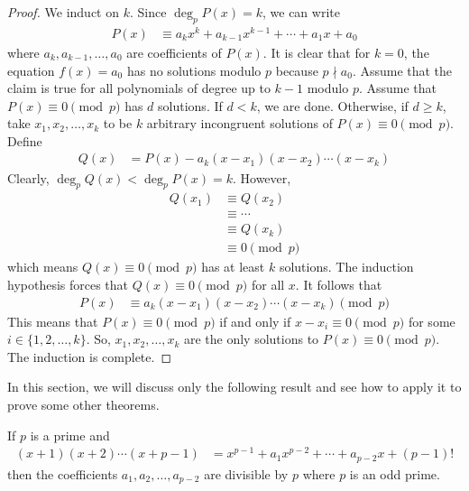 \documentclass[12pt]{subfile}
\begin{document}
		\begin{proof}
			We induct on $k$. Since $\deg_p P(x) = k$, we can write
				\begin{align*}
					P(x)
						& \equiv a_kx^k + a_{k-1}x^{k-1} + \cdots + a_1 x +a_0
				\end{align*}
			where $a_k, a_{k-1}, \ldots, a_0$ are coefficients of $P(x)$. It is clear that for $k=0$, the equation $f(x)=a_0$ has no solutions modulo $p$ because $p \nmid a_0$. Assume that the claim is true for all polynomials of degree up to $k-1$ modulo $p$. Assume that $P(x) \equiv 0 \pmod p$ has $d$ solutions. If $d < k$, we are done. Otherwise, if $d\geq k$, take $x_1, x_2, \ldots, x_k$ to be $k$ arbitrary incongruent solutions of $P(x) \equiv 0 \pmod p$. Define
				\begin{align*}
					Q(x)
						& = P(x) - a_k(x-x_1)(x-x_2)\cdots (x-x_k)
				\end{align*}
			Clearly, $\deg_p Q(x) < \deg_p P(x)=k$. However,
				\begin{align*}
					Q(x_1)
						& \equiv Q(x_2)\\
						& \equiv \cdots \\
						& \equiv Q(x_k)\\
						& \equiv 0 \pmod p
				\end{align*}
			which means $Q(x) \equiv 0 \pmod p$ has at least $k$ solutions. The induction hypothesis forces that $Q(x) \equiv 0 \pmod p$ for all $x$. It follows that
				\begin{align*}
					P(x)
						& \equiv a_k(x-x_1)(x-x_2)\cdots (x-x_k) \pmod p
				\end{align*}
			This means that $P(x) \equiv 0 \pmod p$ if and only if $x-x_i \equiv 0 \pmod p$ for some $i \in \{1,2,\ldots, k\}$. So, $x_1, x_2, \ldots, x_k$ are the only solutions to $P(x) \equiv 0 \pmod p$. The induction is complete.
		\end{proof}


	In this section, we will discuss only the following result and see how to apply it to prove some other theorems.
		\begin{theorem}[Lagrange]
			If $p$ is a prime and\label{thm:lag2}
				\begin{align}\label{eq:lagrangeproof0}
					(x+1)(x+2)\cdots(x+p-1) & = x^{p-1}+a_1x^{p-2}+\cdots+a_{p-2}x+(p-1)!
				\end{align}
			then the coefficients $a_1,a_2, \ldots,a_{p-2}$ are divisible by $p$ where $p$ is an odd prime.
		\end{theorem}
\end{document}
